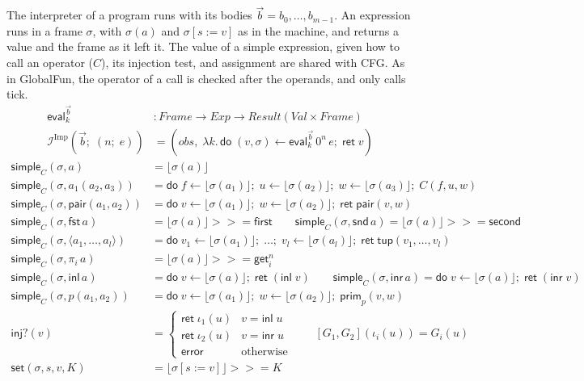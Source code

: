 \documentclass[10pt]{article}
\theoremstyle{acmplain}
\newcommand{\key}[1]{\mathsf{#1}}
\newcommand{\inl}{\key{inl}\,}
\newcommand{\inr}{\key{inr}\,}
\newcommand{\tuple}[1]{\langle #1 \rangle}
\newcommand{\prj}[1]{\pi_{#1}\,}
\newcommand{\pair}[2]{\key{pair}(#1, #2)}
\newcommand{\FST}{\key{fst}\,}
\newcommand{\SND}{\key{snd}\,}
\newcommand{\prim}[3]{#1(#2, #3)}
\newcommand{\error}{\key{error}}
\newcommand{\obs}{\mathit{obs}}
\newcommand{\tupV}[1]{\key{tup}(#1)}
\newcommand{\pairV}[2]{\key{pair}(#1, #2)}
\newcommand{\inlV}{\key{inl}\;}
\newcommand{\inrV}{\key{inr}\;}
\newcommand{\Ret}{\key{ret}\;}
\newcommand{\bind}{\mathbin{>\!\!>\!\!=}}
\newcommand{\Do}{\key{do}\;}
\newcommand{\lift}[1]{\lfloor #1 \rfloor}
\newcommand{\EV}[2]{\key{eval}^{#1}_{#2}}
\newcommand{\Interp}[1]{\mathcal{I}^{#1}}
\begin{document}
The interpreter of a program runs with its bodies $\vec{b} = b_0, \ldots, b_{m-1}$.
An expression runs in a frame $\sigma$, with $\sigma(a)$ and $\sigma[s := v]$ as in
the machine, and returns a value and the frame as it left it. The value
of a simple expression, given how to call an operator ($C$), its
injection test, and assignment are shared with CFG. As in GlobalFun, the
operator of a call is checked after the operands, and only calls tick.
\begin{align*}
  \EV{\vec{b}}{k} &: \mathit{Frame} \to \mathit{Exp} \to \mathit{Result}(\mathit{Val} \times \mathit{Frame}) \\
  \Interp{\mathrm{Imp}}(\vec{b};\; (n;\; e)) &= (\obs,\; \lambda k.\, \Do (v, \sigma) \leftarrow \EV{\vec{b}}{k}\,0^n\,e;\; \Ret v)
\end{align*}
\begin{align*}
  \key{simple}_C(\sigma, a) &= \lift{\sigma(a)} \\
  \key{simple}_C(\sigma, a_1(a_2, a_3)) &=
    \Do f \leftarrow \lift{\sigma(a_1)};\; u \leftarrow \lift{\sigma(a_2)};\; w \leftarrow \lift{\sigma(a_3)};\; C(f, u, w) \\
  \key{simple}_C(\sigma, \pair{a_1}{a_2}) &=
    \Do v \leftarrow \lift{\sigma(a_1)};\; w \leftarrow \lift{\sigma(a_2)};\; \Ret \pairV{v}{w} \\
  \key{simple}_C(\sigma, \FST a) &= \lift{\sigma(a)} \bind \key{first} \qquad
  \key{simple}_C(\sigma, \SND a) = \lift{\sigma(a)} \bind \key{second} \\
  \key{simple}_C(\sigma, \tuple{a_1, \ldots, a_l}) &=
    \Do v_1 \leftarrow \lift{\sigma(a_1)};\; \ldots;\; v_l \leftarrow \lift{\sigma(a_l)};\; \Ret \tupV{v_1, \ldots, v_l} \\
  \key{simple}_C(\sigma, \prj{i} a) &= \lift{\sigma(a)} \bind \key{get}^n_i \\
  \key{simple}_C(\sigma, \inl a) &= \Do v \leftarrow \lift{\sigma(a)};\; \Ret (\inlV v) \qquad
  \key{simple}_C(\sigma, \inr a) = \Do v \leftarrow \lift{\sigma(a)};\; \Ret (\inrV v) \\
  \key{simple}_C(\sigma, \prim{p}{a_1}{a_2}) &=
    \Do v \leftarrow \lift{\sigma(a_1)};\; w \leftarrow \lift{\sigma(a_2)};\; \key{prim}_p(v, w) \\[1ex]
  \key{inj?}(v) &= \begin{cases}
      \Ret \iota_1(u) & v = \inlV u \\
      \Ret \iota_2(u) & v = \inrV u \\
      \error & \text{otherwise}
    \end{cases} \qquad
  [G_1, G_2](\iota_i(u)) = G_i(u) \\
  \key{set}(\sigma, s, v, K) &= \lift{\sigma[s := v]} \bind K
\end{align*}
\end{document}
